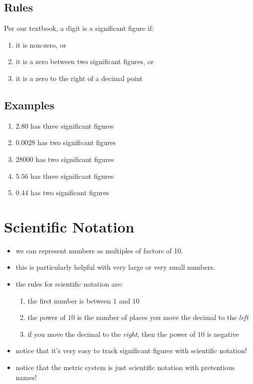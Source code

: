 \documentclass[11pt, oneside]{article}   	%
\begin{document}
\subsection{Rules}
Per our textbook\cite[p. 21]{wile-chem-2}, a digit is a significant figure if:
\begin{enumerate}
\item it is non-zero, or
\item it is a zero between two significant figures, or
\item it is a zero to the right of a decimal point
\end{enumerate}

\subsection{Examples}
\begin{enumerate}[label=Example \arabic*]
\item $2.80$ has three significant figures
\item $0.0028$ has two significant figures
\item $28000$ has two significant figures
\item $5.56$ has three significant figures
\item $0.44$ has two significant figures
\end{enumerate}


\section{Scientific Notation}
\begin{itemize}
\item we can represent numbers as multiples of factors of 10.
\item this is particularly helpful with very large or very small numbers.
\item the rules for scientific notation are:
\begin{enumerate}
\item the first number is between $ 1 $ and $ 10 $
\item  the power of $ 10 $ is the number of places you move the decimal to the \emph{left}
\item if you move the decimal to the \emph{right}, then the power of $ 10 $ is negative
\end{enumerate}
\item notice that it's very easy to track significant figures with scientific notation!
\item notice that the metric system is just scientific notation with pretentious names!
 \end{itemize}
\end{document}
